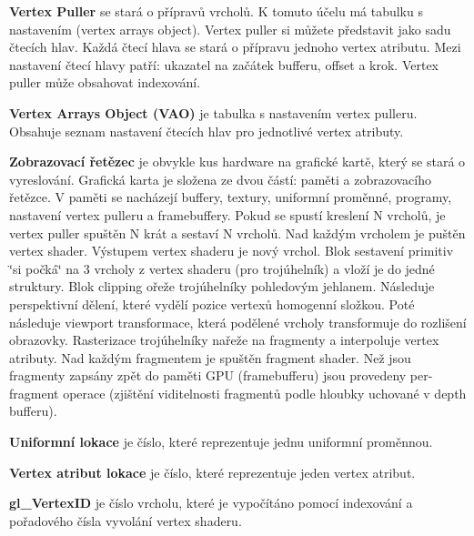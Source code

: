 {\bfseries Vertex Puller} se stará o přípravů vrcholů. K tomuto účelu má tabulku s nastavením (vertex arrays object). Vertex puller si můžete představit jako sadu čtecích hlav. Každá čtecí hlava se stará o přípravu jednoho vertex atributu. Mezi nastavení čtecí hlavy patří\-: ukazatel na začátek bufferu, offset a krok. Vertex puller může obsahovat indexování.

{\bfseries Vertex Arrays Object (V\-A\-O)} je tabulka s nastavením vertex pulleru. Obsahuje seznam nastavení čtecích hlav pro jednotlivé vertex atributy.

{\bfseries Zobrazovací řetězec} je obvykle kus hardware na grafické kartě, který se stará o vyreslování. Grafická karta je složena ze dvou částí\-: paměti a zobrazovacího řetězce. V paměti se nacházejí buffery, textury, uniformní proměnné, programy, nastavení vertex pulleru a framebuffery. Pokud se spustí kreslení N vrcholů, je vertex puller spuštěn N krát a sestaví N vrcholů. Nad každým vrcholem je puštěn vertex shader. Výstupem vertex shaderu je nový vrchol. Blok sestavení primitiv \char`\"{}si počká\char`\"{} na 3 vrcholy z vertex shaderu (pro trojúhelník) a vloží je do jedné struktury. Blok clipping ořeže trojúhelníky pohledovým jehlanem. Následuje perspektivní dělení, které vydělí pozice vertexů homogenní složkou. Poté následuje viewport transformace, která podělené vrcholy transformuje do rozlišení obrazovky. Rasterizace trojúhelníky nařeže na fragmenty a interpoluje vertex atributy. Nad každým fragmentem je spuštěn fragment shader. Než jsou fragmenty zapsány zpět do paměti G\-P\-U (framebufferu) jsou provedeny per-\/fragment operace (zjištění viditelnosti fragmentů podle hloubky uchované v depth bufferu). 

{\bfseries Uniformní lokace} je číslo, které reprezentuje jednu uniformní proměnnou.

{\bfseries Vertex atribut lokace} je číslo, které reprezentuje jeden vertex atribut.

{\bfseries gl\-\_\-\-Vertex\-I\-D} je číslo vrcholu, které je vypočítáno pomocí indexování a pořadového čísla vyvolání vertex shaderu.

